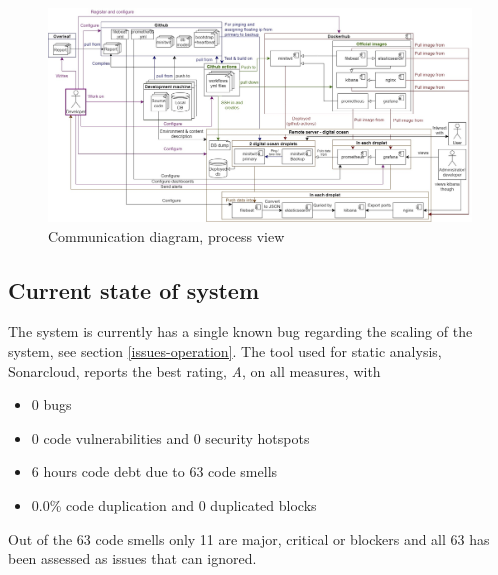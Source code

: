 \begin{figure}[H]
    \centering
    \hspace*{-1.5in}
    \includegraphics[width=1.6\textwidth]{images/Diagrams-Process_view_communication_diagram.jpg}
    \caption{Communication diagram, process view}
    \label{fig:communicationDiagram}
\end{figure}

\subsection{Current state of system}
The system is currently has a single known bug regarding the scaling of the system, see section \ref{issues-operation}. The tool used for static analysis, Sonarcloud, reports the best rating, \textit{A}, on all measures, with 

\begin{itemize}
    \item 0 bugs
    \item 0 code vulnerabilities and 0 security hotspots
    \item 6 hours code debt due to 63 code smells
    \item 0.0\% code duplication and 0 duplicated blocks
\end{itemize}

Out of the 63 code smells only 11 are major, critical or blockers and all 63 has been assessed as issues that can ignored.

